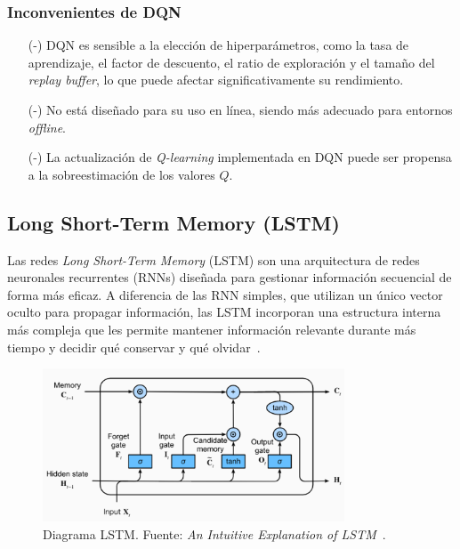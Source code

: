 \subsubsection{Inconvenientes de DQN \cite{dhumne2019dqn}}
\begin{itemize}
    \item[(-)] DQN es sensible a la elección de hiperparámetros, como la tasa de aprendizaje, el 
    factor de descuento, el ratio de exploración y el tamaño del \textit{replay buffer}, lo que 
    puede afectar significativamente su rendimiento.
    \item[(-)] No está diseñado para su uso en línea, siendo más adecuado para entornos 
    \textit{offline}.
    \item[(-)] La actualización de \textit{Q-learning} implementada en DQN puede ser propensa a la 
    sobreestimación de los valores \( Q \).
\end{itemize}

\subsection{Long Short-Term Memory (LSTM)}
Las redes \textit{Long Short-Term Memory} (LSTM) son una arquitectura de redes neuronales 
recurrentes (RNNs) diseñada para gestionar información secuencial de forma más eficaz. A diferencia 
de las RNN simples, que utilizan un único vector oculto para propagar información, las LSTM 
incorporan una estructura interna más compleja que les permite mantener información relevante 
durante más tiempo y decidir qué conservar y qué olvidar~\cite{bulling2024rnn}.

\begin{figure}[ht]
    \centering
    \includegraphics[width=0.8\textwidth]{images/LSTM_diagram.png}
    \caption{Diagrama LSTM. Fuente: \textit{An Intuitive Explanation of LSTM}~\cite{calzone2020lstm}.}
    \label{fig:lstm_diagram}
\end{figure}

